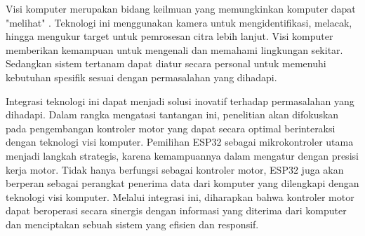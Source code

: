 Visi komputer merupakan bidang keilmuan yang memungkinkan komputer dapat "melihat" \cite{TIAN20201}. Teknologi ini menggunakan kamera untuk mengidentifikasi, melacak, hingga mengukur target untuk pemrosesan citra lebih lanjut. Visi komputer memberikan kemampuan untuk mengenali dan memahami lingkungan sekitar. Sedangkan sistem tertanam dapat diatur secara personal untuk memenuhi kebutuhan spesifik sesuai dengan permasalahan yang dihadapi. 

Integrasi teknologi ini dapat menjadi solusi inovatif terhadap permasalahan yang dihadapi. Dalam rangka mengatasi tantangan ini, penelitian akan difokuskan pada pengembangan kontroler motor yang dapat secara optimal berinteraksi dengan teknologi visi komputer. Pemilihan ESP32 sebagai mikrokontroler utama menjadi langkah strategis, karena kemampuannya dalam mengatur dengan presisi kerja motor. Tidak hanya berfungsi sebagai kontroler motor, ESP32 juga akan berperan sebagai perangkat penerima data dari komputer yang dilengkapi dengan teknologi visi komputer. Melalui integrasi ini, diharapkan bahwa kontroler motor dapat beroperasi secara sinergis dengan informasi yang diterima dari komputer dan menciptakan sebuah sistem yang efisien dan responsif. 
